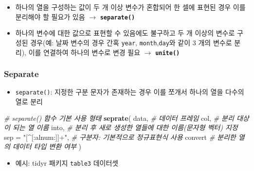 \documentclass[
  11pt,
]{krantz}
\newenvironment{Shaded}{\begin{snugshade}}{\end{snugshade}}
\newcommand{\CommentTok}[1]{\textcolor[rgb]{0.37,0.37,0.37}{\textit{#1}}}
\newcommand{\DataTypeTok}[1]{\textcolor[rgb]{0.27,0.27,0.27}{#1}}
\newcommand{\KeywordTok}[1]{\textcolor[rgb]{0.27,0.27,0.27}{\textbf{#1}}}
\newcommand{\NormalTok}[1]{#1}
\newcommand{\OperatorTok}[1]{\textcolor[rgb]{0.43,0.43,0.43}{\textbf{#1}}}
\newcommand{\StringTok}[1]{\textcolor[rgb]{0.5,0.5,0.5}{#1}}
\providecommand{\tightlist}{%
  \setlength{\itemsep}{0pt}\setlength{\parskip}{0pt}}
\begin{document}
\begin{itemize}
\tightlist
\item
  하나의 열을 구성하는 값이 두 개 이상 변수가 혼합되어 한 셀에 표현된 경우 이를 분리해야 할 필요가 있음 \(\rightarrow\) \textbf{\texttt{separate()}}
\item
  하나의 변수에 대한 값으로 표현할 수 있음에도 불구하고 두 개 이상의 변수로 구성된 경우(예: 날짜 변수의 경우 간혹 \texttt{year}, \texttt{month},\texttt{day}와 같이 3 개의 변수로 분리), 이를 연결하여 하나의 변수로 변경 필요 \(\rightarrow\) \textbf{\texttt{unite()}}
\end{itemize}

\hypertarget{saparate}{%
\subsubsection*{Separate}\label{saparate}}


\begin{itemize}
\tightlist
\item
  \texttt{separate()}: 지정한 구분 문자가 존재하는 경우 이를 쪼개서 하나의 열을 다수의 열로 분리
\end{itemize}

\footnotesize

\begin{Shaded}
\begin{Highlighting}[]
\CommentTok{# separate() 함수 기본 사용 형태}
\KeywordTok{seprate}\NormalTok{(}
\NormalTok{  data, }\CommentTok{# 데이터 프레임}
\NormalTok{  col, }\CommentTok{# 분리 대상이 되는 열 이름}
\NormalTok{  into, }\CommentTok{# 분리 후 새로 생성한 열들에 대한 이름(문자형 벡터) 지정}
  \DataTypeTok{sep =} \StringTok{"[^[:alnum:]]+"}\NormalTok{, }\CommentTok{# 구분자: 기본적으로 정규표현식 사용}
\NormalTok{  convert }\CommentTok{# 분리한 열의 데이터 타입 변환 여부}
\NormalTok{)}
\end{Highlighting}
\end{Shaded}

\normalsize

\begin{itemize}
\tightlist
\item
  예시: tidyr 패키지 \texttt{table3} 데이터셋
\end{itemize}

\footnotesize

\begin{Shaded}
\end{Shaded}
\end{document}
